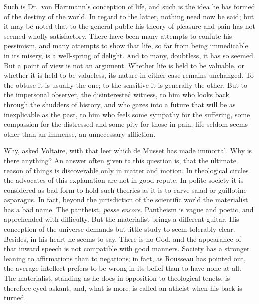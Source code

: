 \documentclass[]{book}
\begin{document}
Such is Dr.~von Hartmann's conception of life, and such is the idea he
has formed of the destiny of the world. In regard to the latter, nothing
need now be said; but it may be noted that to the general public his
theory of pleasure and pain has not seemed wholly satisfactory. There
have been many attempts to confute his pessimism, and many attempts to
show that life, so far from being immedicable in its misery, is a
well-spring of delight. And to many, doubtless, it has so seemed. But a
point of view is not an argument. Whether life is held to be valuable,
or whether it is held to be valueless, its nature in either case remains
unchanged. To the obtuse it is usually the one; to the sensitive it is
generally the other. But to the impersonal observer, the disinterested
witness, to him who looks back through the shudders of history, and who
gazes into a future that will be as inexplicable as the past, to him who
feels some sympathy for the suffering, some compassion for the
distressed and some pity for those in pain, life seldom seems other than
an immense, an unnecessary affliction.

Why, asked Voltaire, with that leer which de Musset has made immortal.
Why is there anything? An answer often given to this question is, that
the ultimate reason of things is discoverable only in matter and motion.
In theological circles the advocates of this explanation are not in good
repute. In polite society it is considered as bad form to hold such
theories as it is to carve salad or guillotine asparagus. In fact,
beyond the jurisdiction of the scientific world the materialist has a
bad name. The pantheist, \emph{passe encore}. Pantheism is vague and
poetic, and apprehended with difficulty. But the materialist brings a
different guitar. His conception of the universe demands but little
study to seem tolerably clear. Besides, in his heart he seems to say,
There is no God, and the appearance of that inward speech is not
compatible with good manners. Society has a stronger leaning to
affirmations than to negations; in fact, as Rousseau has pointed out,
the average intellect prefers to be wrong in its belief than to have
none at all. The materialist, standing as he does in opposition to
theological tenets, is therefore eyed askant, and, what is more, is
called an atheist when his back is turned.
\end{document}
